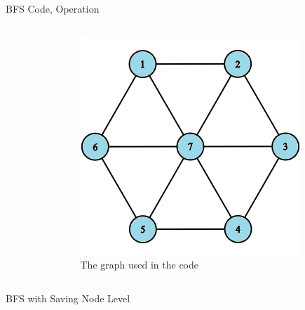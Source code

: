 \documentclass[aspectratio=169]{beamer}%
\begin{document}
\begin{frame}{BFS Code, Operation}
    \begin{columns}
        \begin{column}{0.70\textwidth}
        \end{column}
        \hfill
        \begin{column}{0.25\textwidth}
            \begin{figure}[ht]
                \centering
                \includegraphics[width = .9\linewidth]{bfs 18.png}
                \caption{The graph used in the code}
            \end{figure}{}
        \end{column}
    \end{columns}    
\end{frame}

\begin{frame}{BFS with Saving Node Level}
\end{frame}
\end{document}
